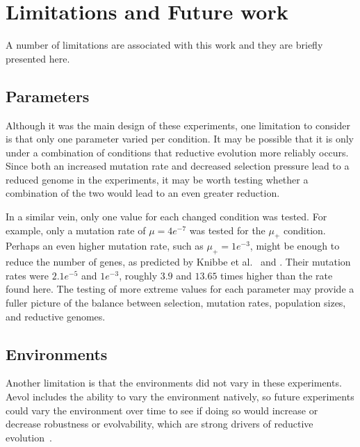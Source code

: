 \section{Limitations and Future work}\label{limitations}
A number of limitations are associated with this work and they are briefly presented here. 
\subsection{Parameters}
Although it was the main design of these experiments, one limitation to consider is that only one parameter varied per condition. It may be possible that it is only under a combination of conditions that reductive evolution more reliably occurs. Since both an increased mutation rate and decreased selection pressure lead to a reduced genome in the experiments, it may be worth testing whether a combination of the two would lead to an even greater reduction. 

In a similar vein, only one value for each changed condition was tested. For example, only a mutation rate of $\mu = 4e^{-7}$ was tested for the $\mu_+$ condition. Perhaps an even higher mutation rate, such as $\mu_+ = 1e^{-3}$, might be enough to reduce the number of genes, as predicted by Knibbe et al.~\cite{Knibbe2007} and \cite{Liard.2018}. Their mutation rates were $2.1e^{-5}$ and $1e^{-3}$, roughly $3.9$ and $13.65$ times higher than the rate found here. The testing of more extreme values for each parameter may provide a fuller picture of the balance between selection, mutation rates, population sizes, and reductive genomes. 

\subsection{Environments}
Another limitation is that the environments did not vary in these experiments. Aevol includes the ability to vary the environment natively, so future experiments could vary the environment over time to see if doing so would increase or decrease robustness or evolvability, which are strong drivers of reductive evolution~\cite{Batut.2013}. 

